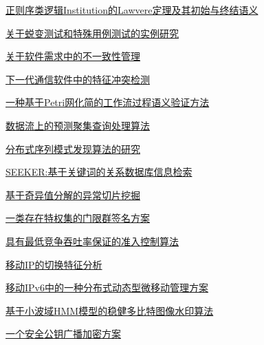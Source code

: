 \documentclass[a4paper]{article}
\begin{document}
\href{http://www.jos.org.cn/ch/reader/download_pdf.aspx?file_no=20050702&year_id=2005&quarter_id=7&falg=1}{正则序类逻辑Institution的Lawvere定理及其初始与终结语义}

\href{http://www.jos.org.cn/ch/reader/download_pdf.aspx?file_no=20050703&year_id=2005&quarter_id=7&falg=1}{关于蜕变测试和特殊用例测试的实例研究}

\href{http://www.jos.org.cn/ch/reader/download_pdf.aspx?file_no=20050704&year_id=2005&quarter_id=7&falg=1}{关于软件需求中的不一致性管理}

\href{http://www.jos.org.cn/ch/reader/download_pdf.aspx?file_no=20050705&year_id=2005&quarter_id=7&falg=1}{下一代通信软件中的特征冲突检测}

\href{http://www.jos.org.cn/ch/reader/download_pdf.aspx?file_no=20050706&year_id=2005&quarter_id=7&falg=1}{一种基于Petri网化简的工作流过程语义验证方法}

\href{http://www.jos.org.cn/ch/reader/download_pdf.aspx?file_no=20050707&year_id=2005&quarter_id=7&falg=1}{数据流上的预测聚集查询处理算法}

\href{http://www.jos.org.cn/ch/reader/download_pdf.aspx?file_no=20050708&year_id=2005&quarter_id=7&falg=1}{分布式序列模式发现算法的研究}

\href{http://www.jos.org.cn/ch/reader/download_pdf.aspx?file_no=20050709&year_id=2005&quarter_id=7&falg=1}{SEEKER:基于关键词的关系数据库信息检索}

\href{http://www.jos.org.cn/ch/reader/download_pdf.aspx?file_no=20050710&year_id=2005&quarter_id=7&falg=1}{基于奇异值分解的异常切片挖掘}

\href{http://www.jos.org.cn/ch/reader/download_pdf.aspx?file_no=20050711&year_id=2005&quarter_id=7&falg=1}{一类存在特权集的门限群签名方案}

\href{http://www.jos.org.cn/ch/reader/download_pdf.aspx?file_no=20050712&year_id=2005&quarter_id=7&falg=1}{具有最低竞争吞吐率保证的准入控制算法}

\href{http://www.jos.org.cn/ch/reader/download_pdf.aspx?file_no=20050713&year_id=2005&quarter_id=7&falg=1}{移动IP的切换特征分析}

\href{http://www.jos.org.cn/ch/reader/download_pdf.aspx?file_no=20050714&year_id=2005&quarter_id=7&falg=1}{移动IPv6中的一种分布式动态型微移动管理方案}

\href{http://www.jos.org.cn/ch/reader/download_pdf.aspx?file_no=20050715&year_id=2005&quarter_id=7&falg=1}{基于小波域HMM模型的稳健多比特图像水印算法}

\href{http://www.jos.org.cn/ch/reader/download_pdf.aspx?file_no=20050716&year_id=2005&quarter_id=7&falg=1}{一个安全公钥广播加密方案}
\end{document}
